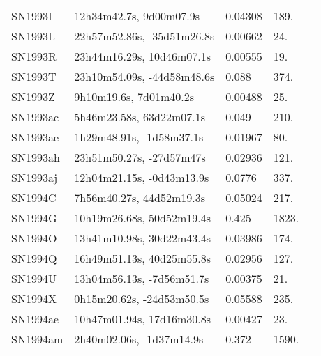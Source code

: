 \begin{longtable}{lllll}
          SN1993I &        12h34m42.7s, 9d00m07.9s &  0.04308 &           189. &    \citet{2004SDSS3.C...0000:} \\
          SN1993L &     22h57m52.86s, -35d51m26.8s &  0.00662 &            24. &    \citet{2006HIPAS.C...0000:} \\
          SN1993R &      23h44m16.29s, 10d46m07.1s &  0.00555 &            19. &  \citet{1998AandAS..130..333T} \\
          SN1993T &     23h10m54.09s, -44d58m48.6s &    0.088 &           374. &    \citet{1993IAUC.5827....1C} \\
          SN1993Z &         9h10m19.6s, 7d01m40.2s &  0.00488 &            25. &    \citet{2004SDSS3.C...0000:} \\
         SN1993ac &       5h46m23.58s, 63d22m07.1s &    0.049 &           210. &    \citet{1993IAUC.5882....1S} \\
         SN1993ae &       1h29m48.91s, -1d58m37.1s &  0.01967 &            80. &    \citet{20096dF...C...0000J} \\
         SN1993ah &       23h51m50.27s, -27d57m47s &  0.02936 &           121. &    \citet{2002AJ....123.2990B} \\
         SN1993aj &      12h04m21.15s, -0d43m13.9s &   0.0776 &           337. &    \citet{2003SDSS1.C...0000:} \\
          SN1994C &       7h56m40.27s, 44d52m19.3s &  0.05024 &           217. &    \citet{2003SDSS1.C...0000:} \\
          SN1994G &      10h19m26.68s, 50d52m19.4s &    0.425 &          1823. &    \citet{1999ApJ...517..565P} \\
          SN1994O &      13h41m10.98s, 30d22m43.4s &  0.03986 &           174. &    \citet{1991RC3.9.C...0000d} \\
          SN1994Q &      16h49m51.13s, 40d25m55.8s &  0.02956 &           127. &    \citet{2002AJ....124.1266R} \\
          SN1994U &      13h04m56.13s, -7d56m51.7s &  0.00375 &            21. &    \citet{2006HIPAS.C...0000:} \\
          SN1994X &      0h15m20.62s, -24d53m50.5s &  0.05588 &           235. &    \citet{20096dF...C...0000J} \\
         SN1994ae &      10h47m01.94s, 17d16m30.8s &  0.00427 &            23. &    \citet{1980AJ.....85.1312K} \\
         SN1994am &       2h40m02.06s, -1d37m14.9s &    0.372 &          1590. &    \citet{1999ApJ...517..565P} \\

\end{longtable}

